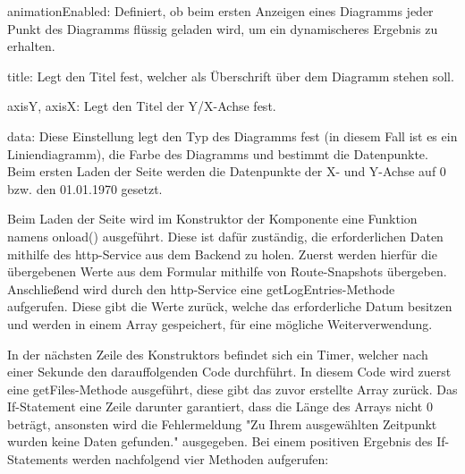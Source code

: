 \begin{compactitem}
    \item animationEnabled: Definiert, ob beim ersten Anzeigen eines Diagramms jeder Punkt des Diagramms flüssig geladen wird, um ein dynamischeres Ergebnis zu erhalten.   
    \item title: Legt den Titel fest, welcher als Überschrift über dem Diagramm stehen soll.         
    \item axisY, axisX: Legt den Titel der Y/X-Achse fest.
    \item data: Diese Einstellung legt den Typ des Diagramms fest (in diesem Fall ist es ein Liniendiagramm), die Farbe des Diagramms und bestimmt die Datenpunkte. Beim ersten Laden der Seite werden die Datenpunkte der X- und Y-Achse auf 0 bzw. den 01.01.1970 gesetzt.
\end{compactitem}

 
Beim Laden der Seite wird im Konstruktor der Komponente eine Funktion namens onload() ausgeführt. Diese ist dafür zuständig, die erforderlichen Daten mithilfe des http-Service aus dem Backend zu holen. Zuerst werden hierfür die übergebenen Werte aus dem Formular mithilfe von Route-Snapshots übergeben. Anschließend wird durch den http-Service eine getLogEntries-Methode aufgerufen. Diese gibt die Werte zurück, welche das erforderliche Datum besitzen und werden in einem Array gespeichert, für eine mögliche Weiterverwendung.
 
In der nächsten Zeile des Konstruktors befindet sich ein Timer, welcher nach einer Sekunde den darauffolgenden Code durchführt. In diesem Code wird zuerst eine getFiles-Methode ausgeführt, diese gibt das zuvor erstellte Array zurück. Das If-Statement eine Zeile darunter garantiert, dass die Länge des Arrays nicht 0 beträgt, ansonsten wird die Fehlermeldung "Zu Ihrem ausgewählten Zeitpunkt wurden keine Daten gefunden." ausgegeben. Bei einem positiven Ergebnis des If-Statements werden nachfolgend vier Methoden aufgerufen:
 
